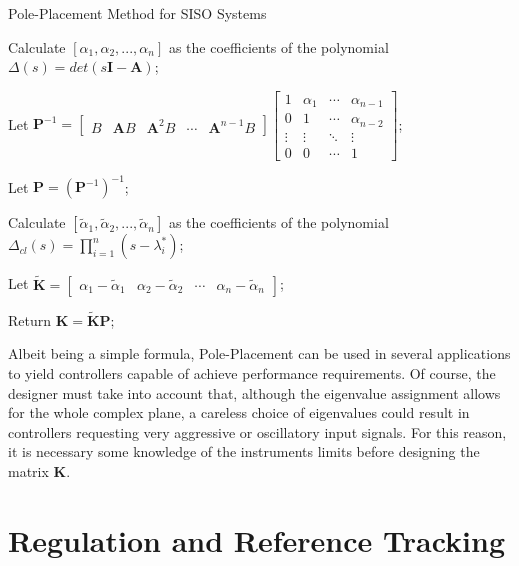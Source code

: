 \documentclass[a4paper,11pt]{book}
\numberwithin{figure}{chapter}
\numberwithin{equation}{chapter}
\numberwithin{table}{chapter}
\theoremstyle{definition}
\begin{document}
\begin{algorithm}[ht] 
    \caption{Pole-Placement Method for SISO Systems} \label{alg:stateFeedback}
    \SetAlgoLined
    
    \vskip0.25cm
    
    Calculate $[\alpha_1, \alpha_2, ..., \alpha_n]$ as the coefficients of the polynomial $\Delta(s) = det(s\bm{I} - \bm{A})$;
    
    Let $\bm{P}^{-1} = \begin{bmatrix} B & \bm{A} B & \bm{A}^2 B & \cdots & \bm{A}^{n-1} B \end{bmatrix} \begin{bmatrix}
        1 & \alpha_1 & \cdots  & \alpha_{n-1} \\
        0 & 1 & \cdots & \alpha_{n-2} \\
        \vdots & \vdots & \ddots & \vdots \\
        0 & 0 & \cdots &1
        \end{bmatrix}$;
    
    Let $\bm{P} = \left( \bm{P}^{-1} \right)^{-1}$;
    
    Calculate $[\tilde{\alpha}_1, \tilde{\alpha}_2, ..., \tilde{\alpha}_n]$ as the coefficients of the polynomial $\Delta_{cl}(s) = \prod_{i=1}^n (s - \lambda^*_i)$;
    
    Let $\tilde{\bm{K}} = \begin{bmatrix} \alpha_1 - \tilde{\alpha}_1 & \alpha_2 - \tilde{\alpha}_2 & \cdots & \alpha_n - \tilde{\alpha}_n \end{bmatrix}$;
    
    Return $\bm{K} = \tilde{\bm{K}} \bm{P}$;
\end{algorithm} 

Albeit being a simple formula, Pole-Placement can be used in several applications to yield controllers capable of achieve performance requirements. Of course, the designer must take into account that, although the eigenvalue assignment allows for the whole complex plane, a careless choice of eigenvalues could result in controllers requesting very aggressive or oscillatory input signals. For this reason, it is necessary some knowledge of the instruments limits before designing the matrix $\bm{K}$.

\section{Regulation and Reference Tracking}
\end{document}
